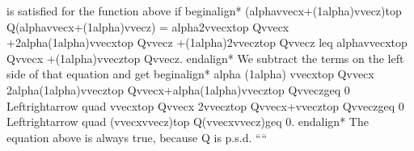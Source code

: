 \documentclass[letterpaper,10pt,english]{jupyterBook}
\begin{document}
\begin{sphinxVerbatim}[commandchars=\\\{\}]
is satisfied for the function above if
\PYGZbs{}begin\PYGZob{}align*\PYGZcb{}
(\PYGZbs{}alpha\PYGZbs{}vvec\PYGZob{}x\PYGZcb{}+(1\PYGZhy{}\PYGZbs{}alpha)\PYGZbs{}vvec\PYGZob{}z\PYGZcb{})\PYGZca{}\PYGZbs{}top Q(\PYGZbs{}alpha\PYGZbs{}vvec\PYGZob{}x\PYGZcb{}+(1\PYGZhy{}\PYGZbs{}alpha)\PYGZbs{}vvec\PYGZob{}z\PYGZcb{})
\PYGZam{}= \PYGZbs{}alpha\PYGZca{}2\PYGZbs{}vvec\PYGZob{}x\PYGZcb{}\PYGZca{}\PYGZbs{}top Q\PYGZbs{}vvec\PYGZob{}x\PYGZcb{} +2\PYGZbs{}alpha(1\PYGZhy{}\PYGZbs{}alpha)\PYGZbs{}vvec\PYGZob{}x\PYGZcb{}\PYGZca{}\PYGZbs{}top Q\PYGZbs{}vvec\PYGZob{}z\PYGZcb{} +(1\PYGZhy{}\PYGZbs{}alpha)\PYGZca{}2\PYGZbs{}vvec\PYGZob{}z\PYGZcb{}\PYGZca{}\PYGZbs{}top Q\PYGZbs{}vvec\PYGZob{}z\PYGZcb{}\PYGZbs{}\PYGZbs{}
\PYGZam{}\PYGZbs{}leq \PYGZbs{}alpha\PYGZbs{}vvec\PYGZob{}x\PYGZcb{}\PYGZca{}\PYGZbs{}top Q\PYGZbs{}vvec\PYGZob{}x\PYGZcb{} +(1\PYGZhy{}\PYGZbs{}alpha)\PYGZbs{}vvec\PYGZob{}z\PYGZcb{}\PYGZca{}\PYGZbs{}top Q\PYGZbs{}vvec\PYGZob{}z\PYGZcb{}.
\PYGZbs{}end\PYGZob{}align*\PYGZcb{}
We subtract the terms on the left side of that equation and get
\PYGZbs{}begin\PYGZob{}align*\PYGZcb{}
\PYGZbs{}alpha (1\PYGZhy{}\PYGZbs{}alpha) \PYGZbs{}vvec\PYGZob{}x\PYGZcb{}\PYGZca{}\PYGZbs{}top Q\PYGZbs{}vvec\PYGZob{}x\PYGZcb{} \PYGZhy{}2\PYGZbs{}alpha(1\PYGZhy{}\PYGZbs{}alpha)\PYGZbs{}vvec\PYGZob{}z\PYGZcb{}\PYGZca{}\PYGZbs{}top Q\PYGZbs{}vvec\PYGZob{}x\PYGZcb{}+\PYGZbs{}alpha(1\PYGZhy{}\PYGZbs{}alpha)\PYGZbs{}vvec\PYGZob{}z\PYGZcb{}\PYGZca{}\PYGZbs{}top Q\PYGZbs{}vvec\PYGZob{}z\PYGZcb{}\PYGZam{}\PYGZbs{}geq 0\PYGZbs{}\PYGZbs{}
\PYGZbs{}Leftrightarrow \PYGZbs{}quad \PYGZbs{}vvec\PYGZob{}x\PYGZcb{}\PYGZca{}\PYGZbs{}top Q\PYGZbs{}vvec\PYGZob{}x\PYGZcb{} \PYGZhy{}2\PYGZbs{}vvec\PYGZob{}z\PYGZcb{}\PYGZca{}\PYGZbs{}top Q\PYGZbs{}vvec\PYGZob{}x\PYGZcb{}+\PYGZbs{}vvec\PYGZob{}z\PYGZcb{}\PYGZca{}\PYGZbs{}top Q\PYGZbs{}vvec\PYGZob{}z\PYGZcb{}\PYGZam{}\PYGZbs{}geq 0\PYGZbs{}\PYGZbs{}
\PYGZbs{}Leftrightarrow \PYGZbs{}quad (\PYGZbs{}vvec\PYGZob{}x\PYGZcb{}\PYGZhy{}\PYGZbs{}vvec\PYGZob{}z\PYGZcb{})\PYGZca{}\PYGZbs{}top Q(\PYGZbs{}vvec\PYGZob{}x\PYGZcb{}\PYGZhy{}\PYGZbs{}vvec\PYGZob{}z\PYGZcb{})\PYGZam{}\PYGZbs{}geq 0.
\PYGZbs{}end\PYGZob{}align*\PYGZcb{}
The equation above is always true, because \PYGZdl{}Q\PYGZdl{} is p.s.d.
````
\end{sphinxVerbatim}

\sphinxstepscope
\end{document}
